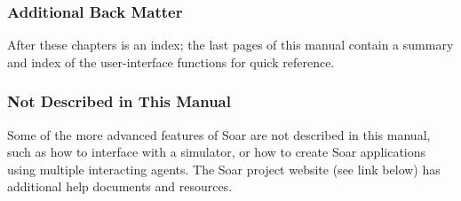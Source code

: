







\subsubsection*{Additional Back Matter}

After these chapters is an index; the last pages of this manual contain a summary and index of the user-interface functions for quick reference.


\subsubsection*{Not Described in This Manual}

Some of the more advanced features of Soar are not described in this
manual, such as how to interface with a simulator, or how to create Soar
applications using multiple interacting agents. The Soar project website (see link below)
has additional help documents and resources.

